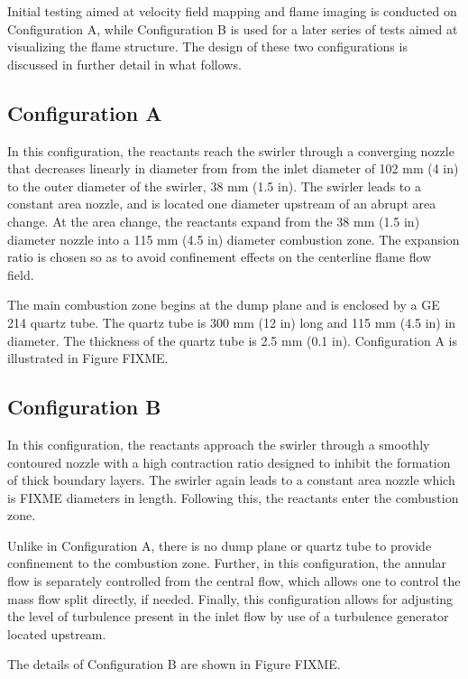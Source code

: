 Initial testing aimed at velocity field mapping and flame imaging is conducted on Configuration A, while Configuration B is used for a later series of tests aimed at visualizing the flame structure.
The design of these two configurations is discussed in further detail in what follows.

\subsection{Configuration A}

In this configuration, the reactants reach the swirler through a converging nozzle that decreases linearly in diameter from from the inlet diameter of 102 mm (4 in) to the outer diameter of the swirler, 38 mm (1.5 in).
The swirler leads to a constant area nozzle, and is located one diameter upstream of an abrupt area change.
At the area change, the reactants expand from the 38 mm (1.5 in) diameter nozzle into a 115 mm (4.5 in) diameter combustion zone.
The expansion ratio is chosen so as to avoid confinement effects on the centerline flame flow field.\cite{1998-yegian}

The main combustion zone begins at the dump plane and is enclosed by a GE 214 quartz tube.
The quartz tube is 300 mm (12 in) long and 115 mm (4.5 in) in diameter.
The thickness of the quartz tube is 2.5 mm (0.1 in).
Configuration A is illustrated in Figure FIXME.

\subsection{Configuration B}

In this configuration, the reactants approach the swirler through a smoothly contoured nozzle with a high contraction ratio designed to inhibit the formation of thick boundary layers.
The swirler again leads to a constant area nozzle which is FIXME diameters in length.
Following this, the reactants enter the combustion zone.

Unlike in Configuration A, there is no dump plane or quartz tube to provide confinement to the combustion zone.
Further, in this configuration, the annular flow is separately controlled from the central flow, which allows one to control the mass flow split directly, if needed.
Finally, this configuration allows for adjusting the level of turbulence present in the inlet flow by use of a turbulence generator located upstream.

The details of Configuration B are shown in Figure FIXME.

